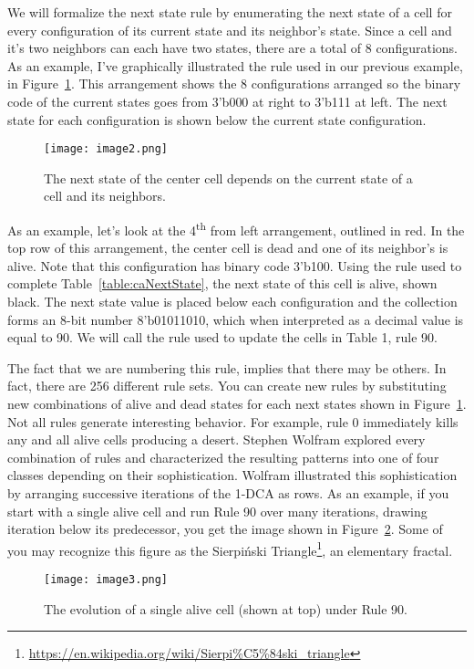 We will formalize the next state rule by enumerating the next state of a
cell for every configuration of its current state and its neighbor's
state. Since a cell and it's two neighbors can each have two states,
there are a total of 8 configurations. As an example, I've graphically
illustrated the rule used in our previous example, in Figure~\ref{fig:caRule}. This
arrangement shows the 8 configurations arranged so the binary code of
the current states goes from 3'b000 at right to 3'b111 at left. The next
state for each configuration is shown below the current state
configuration.

\begin{figure}[ht]
\texttt{[image: image2.png]}
\caption{The next state of the center cell depends on the current state
of a cell and its neighbors.}
\label{fig:caRule}
\end{figure}

As an example, let's look at the 4\textsuperscript{th} from left
arrangement, outlined in red. In the top row of this arrangement, the
center cell is dead and one of its neighbor's is alive. Note that this
configuration has binary code 3'b100. Using the rule used to complete
Table~\ref{table:caNextState}, the next state of this cell is alive, shown black. The next
state value is placed below each configuration and the collection forms
an 8-bit number 8'b01011010, which when interpreted as a decimal value
is equal to 90. We will call the rule used to update the cells in Table
1, rule 90.

The fact that we are numbering this rule, implies that there may be
others. In fact, there are 256 different rule sets. You can create new
rules by substituting new combinations of alive and dead states for each
next states shown in Figure~\ref{fig:caRule}. Not all rules generate interesting
behavior. For example, rule 0 immediately kills any and all alive cells
producing a desert. Stephen Wolfram explored every combination of rules
and characterized the resulting patterns into one of four classes
depending on their sophistication. Wolfram illustrated this
sophistication by arranging successive iterations of the 1-DCA as rows.
As an example, if you start with a single alive cell and run Rule 90
over many iterations, drawing iteration below its predecessor, you get
the image shown in Figure~\ref{fig:caEvolution}. Some of you may recognize this figure as
the Sierpiński Triangle\footnote{\url{https://en.wikipedia.org/wiki/Sierpi\%C5\%84ski_triangle}},
an elementary fractal.

\begin{figure}[ht]
\texttt{[image: image3.png]}
\caption{The evolution of a single alive cell (shown at top) under Rule 90.}
\label{fig:caEvolution}
\end{figure}

